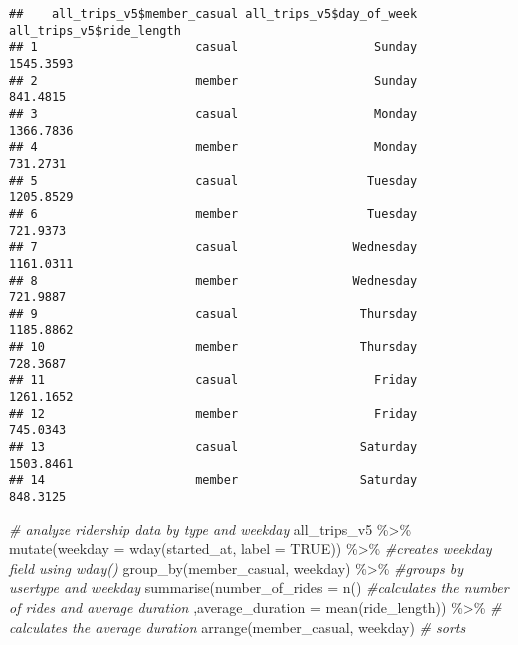 \documentclass[
]{article}
\newenvironment{Shaded}{\begin{snugshade}}{\end{snugshade}}
\newcommand{\AttributeTok}[1]{\textcolor[rgb]{0.77,0.63,0.00}{#1}}
\newcommand{\CommentTok}[1]{\textcolor[rgb]{0.56,0.35,0.01}{\textit{#1}}}
\newcommand{\ConstantTok}[1]{\textcolor[rgb]{0.00,0.00,0.00}{#1}}
\newcommand{\FunctionTok}[1]{\textcolor[rgb]{0.00,0.00,0.00}{#1}}
\newcommand{\NormalTok}[1]{#1}
\newcommand{\SpecialCharTok}[1]{\textcolor[rgb]{0.00,0.00,0.00}{#1}}
\begin{document}
\begin{verbatim}
##    all_trips_v5$member_casual all_trips_v5$day_of_week all_trips_v5$ride_length
## 1                      casual                   Sunday                1545.3593
## 2                      member                   Sunday                 841.4815
## 3                      casual                   Monday                1366.7836
## 4                      member                   Monday                 731.2731
## 5                      casual                  Tuesday                1205.8529
## 6                      member                  Tuesday                 721.9373
## 7                      casual                Wednesday                1161.0311
## 8                      member                Wednesday                 721.9887
## 9                      casual                 Thursday                1185.8862
## 10                     member                 Thursday                 728.3687
## 11                     casual                   Friday                1261.1652
## 12                     member                   Friday                 745.0343
## 13                     casual                 Saturday                1503.8461
## 14                     member                 Saturday                 848.3125
\end{verbatim}

\begin{Shaded}
\begin{Highlighting}[]
\CommentTok{\# analyze ridership data by type and weekday}
\NormalTok{all\_trips\_v5 }\SpecialCharTok{\%\textgreater{}\%} 
  \FunctionTok{mutate}\NormalTok{(}\AttributeTok{weekday =} \FunctionTok{wday}\NormalTok{(started\_at, }\AttributeTok{label =} \ConstantTok{TRUE}\NormalTok{)) }\SpecialCharTok{\%\textgreater{}\%}  \CommentTok{\#creates weekday field using wday()}
  \FunctionTok{group\_by}\NormalTok{(member\_casual, weekday) }\SpecialCharTok{\%\textgreater{}\%}  \CommentTok{\#groups by usertype and weekday}
  \FunctionTok{summarise}\NormalTok{(}\AttributeTok{number\_of\_rides =} \FunctionTok{n}\NormalTok{()                                                        }\CommentTok{\#calculates the number of rides and average duration }
\NormalTok{  ,}\AttributeTok{average\_duration =} \FunctionTok{mean}\NormalTok{(ride\_length)) }\SpecialCharTok{\%\textgreater{}\%}                 \CommentTok{\# calculates the average duration}
  \FunctionTok{arrange}\NormalTok{(member\_casual, weekday)                                                                }\CommentTok{\# sorts}
\end{Highlighting}
\end{Shaded}
\end{document}
